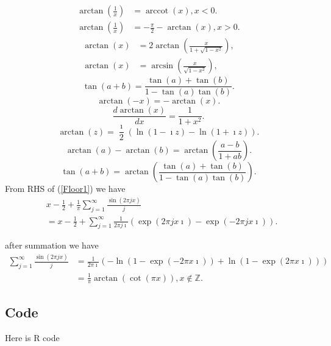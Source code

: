 \documentclass[titlepage,fleqn]{article}%
\providecommand{\U}[1]{\protect\rule{.1in}{.1in}}
\begin{document}
\begin{align*}
\arctan\left(  \frac{1}{x}\right)   &  =\operatorname{arccot}(x),x<0.\\
\arctan\left(  \frac{1}{x}\right)   &  =-\frac{\pi}{2}-\arctan\left(
x\right)  ,x>0.
\end{align*}%
\begin{align*}
\arctan\left(  x\right)   &  =2\arctan\left(  \frac{x}{1+\sqrt{1-x^{2}}%
}\right)  ,\\
\arctan\left(  x\right)   &  =\arcsin\left(  \frac{x}{\sqrt{1-x^{2}}}\right)
,
\end{align*}%
\[
\tan(a+b)=\frac{\tan(a)+\tan(b)}{1-\tan(a)\tan(b)}.
\]%
\[
\arctan\left(  -x\right)  =-\arctan\left(  x\right)  .
\]%
\[
\frac{d\arctan\left(  x\right)  }{dx}=\frac{1}{1+x^{2}}.
\]%
\[
\arctan\left(  z\right)  =\frac{\imath}{2}\left(  \ln(1-\imath z)-\ln(1+\imath
z)\right)  .
\]%
\[
\arctan\left(  a\right)  -\arctan\left(  b\right)  =\arctan\left(  \frac
{a-b}{1+ab}\right)  .
\]%
\[
\tan\left(  a+b\right)  =\arctan\left(  \frac{\tan\left(  a\right)
+\tan\left(  b\right)  }{1-\tan\left(  a\right)  \tan\left(  b\right)
}\right)  .
\]
From RHS of (\ref{Floor1}) we have%
\begin{align}
&  x-\frac{1}{2}+\frac{1}{\pi}%
{\displaystyle\sum\limits_{j=1}^{\infty}}
\frac{\sin(2\pi jx)}{j}\\
&  =x-\frac{1}{2}+%
{\displaystyle\sum\limits_{j=1}^{\infty}}
\frac{1}{2\pi j\imath}\left(  \exp(2\pi jx\imath)-\exp(-2\pi jx\imath)\right)
.
\end{align}


after summation we have%
\begin{align*}%
{\displaystyle\sum\limits_{j=1}^{\infty}}
\frac{\sin(2\pi jx)}{j}  &  =\frac{1}{2\pi\imath}\left(  -\ln\left(
1-\exp(-2\pi x\imath)\right)  +\ln\left(  1-\exp(2\pi x\imath)\right)  \right)
\\
&  =\frac{1}{\pi}\arctan(\cot(\pi x)),x\notin%
\mathbb{Z}
.
\end{align*}


\subsection{Code}

\medskip Here is R code
\end{document}
